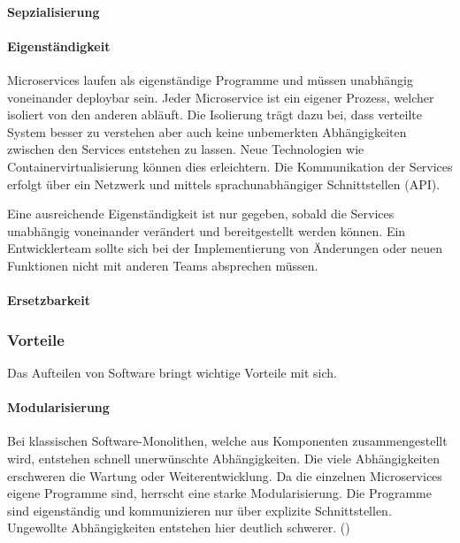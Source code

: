 \paragraph{Sepzialisierung}



\paragraph{Eigenständigkeit}

Microservices laufen als eigenständige Programme und müssen unabhängig voneinander deploybar sein. Jeder Microservice ist ein eigener Prozess, welcher isoliert von den anderen abläuft. Die Isolierung trägt dazu bei, dass verteilte System besser zu verstehen aber auch keine unbemerkten Abhängigkeiten zwischen den Services entstehen zu lassen. Neue Technologien wie Containervirtualisierung können dies erleichtern. Die Kommunikation der Services erfolgt über ein Netzwerk und mittels sprachunabhängiger Schnittstellen (API).

Eine ausreichende Eigenständigkeit ist nur gegeben, sobald die Services unabhängig voneinander verändert und bereitgestellt werden können. Ein Entwicklerteam sollte sich bei der Implementierung von Änderungen oder neuen Funktionen nicht mit anderen Teams absprechen müssen. 

\paragraph{Ersetzbarkeit}



\subsubsection{Vorteile}

Das Aufteilen von Software bringt wichtige Vorteile mit sich.

\paragraph{Modularisierung}
Bei klassischen Software-Monolithen, welche aus Komponenten zusammengestellt wird, entstehen schnell unerwünschte Abhängigkeiten. Die viele Abhängigkeiten erschweren die Wartung oder Weiterentwicklung. Da die einzelnen Microservices eigene Programme sind, herrscht eine starke Modularisierung. Die Programme sind eigenständig und kommunizieren nur über explizite Schnittstellen. Ungewollte Abhängigkeiten entstehen hier deutlich schwerer. (\cite[S. 3]{wolffMicroservices2018})

